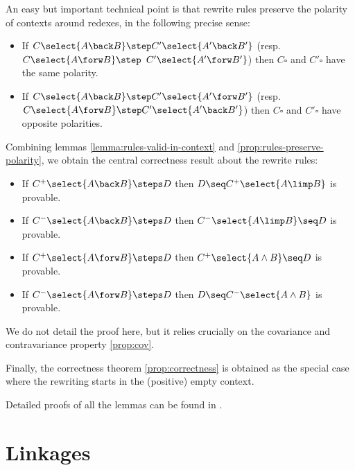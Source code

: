An easy but important technical point is that rewrite rules preserve the
polarity of contexts around redexes, in the following precise sense:
\begin{lemma}\label{prop:rules-preserve-polarity}
  \begin{itemize}
    \item
      If $C\select{A\back B} \step C'\select{A'\back B'}$
      (resp. $C\select{A \forw B} \step $ $ C' \allowbreak\select{A' \forw B'}$) then
      $C\square$ and $C'\square$ have the same polarity.
      \item
        If $C\select{A\back B} \step C'\select{A'\forw B'}$ (resp.
        $C\select{A\forw B} \step C'\select{A'\back B'}$) then $C\square$ and
        $C'\square$ have opposite polarities.
  \end{itemize}

\end{lemma}

Combining lemmas \ref{lemma:rules-valid-in-context} and
\ref{prop:rules-preserve-polarity}, we obtain the central correctness result
about the rewrite rules:
\begin{lemma}\label{lemma:rewriting-valid-in-context}
  \phantom{a}
  \begin{itemize}
    \item If $C^+\select{A\back B}\steps D$ then $D \seq C^+\select{A\limp B}$ is provable.
    \item If $C^-\select{A\back B} \steps D$ then $C^-\select{A\limp B}\seq D$ is provable.
    \item If $C^+\select{A \forw B} \steps D$ then $ C^+\select{A \land B}\seq D$ is provable.
    \item If $C^-\select{A \forw B} \steps D$ then $D \seq C^-\select{A \land B}$ is provable.
  \end{itemize}
\end{lemma}

We do not detail the proof here, but it relies crucially on the covariance and
contravariance property \ref{prop:cov}.

Finally, the correctness theorem \ref{prop:correctness} is obtained as the
special case where the rewriting starts in the (positive) empty context.

Detailed proofs of all the lemmas can be found in .

\section{Linkages}

